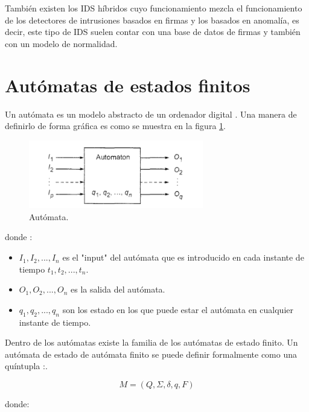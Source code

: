 También existen los IDS híbridos cuyo funcionamiento mezcla el funcionamiento de los detectores de intrusiones basados en firmas y los basados en anomalía, es decir, este tipo de  IDS suelen contar con una base de datos de firmas y también con un modelo de normalidad.

\section{Autómatas de estados finitos}

Un autómata es un modelo abstracto de un ordenador digital \cite{automata}. Una manera de definirlo de forma gráfica es como se muestra en la figura \ref{fig:automata}.

\begin{figure}[tb]
\begin{center}
\includegraphics[width=3in]{./img/automata.png}
\caption{Autómata.\cite{automata2}}
\label{fig:automata}
\end{center}
\end{figure}

donde \cite{automata2}:

\begin{itemize}
\item  $I_{1}, I_{2},..., I_{n}$ es el "input" del autómata  que es introducido en cada instante de tiempo $t_{1}, t_{2},..., t_{n}$.

\item $O_{1}, O_{2},..., O_{n}$ es la salida del autómata.

\item $q_{1}, q_{2},..., q_{n}$ son los estado en los que puede estar el autómata en cualquier instante de tiempo.
\end{itemize}

Dentro de los autómatas existe la familia de los autómatas de estado finito. Un autómata de estado de autómata finito se puede definir formalmente como una quíntupla \cite{automataFinito}:.

\begin{equation}
M = (Q,\Sigma,\delta,q,F)
\end{equation}

donde:

